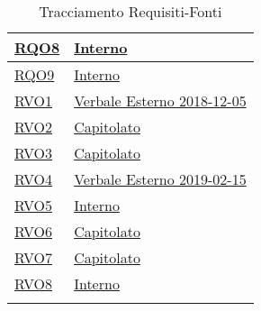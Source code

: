 \begin{longtable}{|>{\centering}m{5cm}|m{5cm}<{\centering}|}
	\hyperlink{RQO8}{RQO8} & \hyperref[Interno]{Interno}\\ \hline
	
	\hyperlink{RQO9}{RQO9} & \hyperref[Interno]{Interno}\\ \hline
	
	\hyperlink{RVO1}{RVO1} & \hyperref[Verbale Esterno 2018-12-05]{Verbale Esterno 2018-12-05}\\ \hline
	
	\hyperlink{RVO2}{RVO2} & \hyperref[Capitolato]{Capitolato}\\ \hline
	
	\hyperlink{RVO3}{RVO3} & \hyperref[Capitolato]{Capitolato}\\ \hline
	
	\hyperlink{RVO4}{RVO4} & \hyperref[Interno]{Verbale Esterno 2019-02-15}\\ \hline
	
	\hyperlink{RVO5}{RVO5} & \hyperref[Interno]{Interno}\\ \hline
	
	\hyperlink{RVO6}{RVO6} & \hyperref[Capitolato]{Capitolato}\\ \hline
	
	\hyperlink{RVO7}{RVO7} & \hyperref[Capitolato]{Capitolato}\\ \hline
	
	\hyperlink{RVO8}{RVO8} & \hyperref[Interno]{Interno}\\ \hline
	
	\caption[Tracciamento Requisiti-Fonti]{Tracciamento Requisiti-Fonti}
	\label{tabella:requi-fonti}
\end{longtable}
\clearpage

